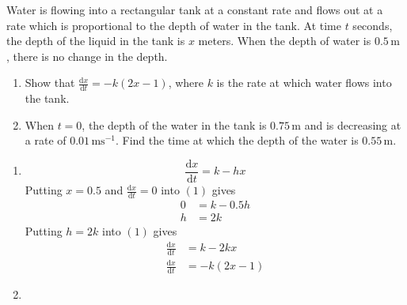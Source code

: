 \documentclass[11pt,a4paper]{book}
\begin{document}
\begin{example}

Water is flowing into a rectangular tank at a constant rate and flows
out at a rate which is proportional to the depth of water in the tank.
At time $t$ seconds, the depth of the liquid in the tank is $x$
meters. When the depth of water is $0.5\,\text{m}$ , there is no
change in the depth.

\begin{enumerate}[label=(\alph*)]

\item Show that ${\displaystyle \frac{\mathrm{d}x}{\mathrm{d}t}=-k\left(2x-1\right)}$,
where $k$ is the rate at which water flows into the tank.

\item When $t=0$, the depth of the water in the tank is $0.75\,\text{m}$
and is decreasing at a rate of $0.01\,\text{ms}^{-1}$. Find the time
at which the depth of the water is $0.55\,\text{m}$.

\end{enumerate}

\Solution

\begin{enumerate}[label=(\alph*)]

\item


\[
\frac{\mathrm{d}x}{\mathrm{d}t}=k-hx\tag{1}
\]
Putting $x=0.5$ and ${\displaystyle \frac{\mathrm{d}x}{\mathrm{d}t}=0}$ into $\left(1\right)$
gives
\begin{align*}
0 & =k-0.5h\\
h & =2k
\end{align*}
Putting $h=2k$ into $\left(1\right)$ gives
\begin{align*}
\frac{\mathrm{d}x}{\mathrm{d}t} & =k-2kx\\
\frac{\mathrm{d}x}{\mathrm{d}t} & =-k\left(2x-1\right)\tag{2}
\end{align*}

\item


\end{enumerate}
\end{example}
\end{document}
